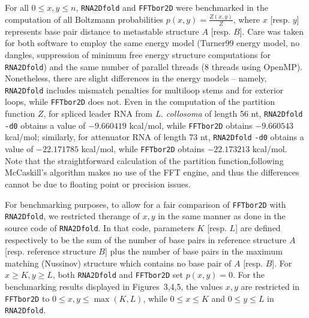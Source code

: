 For all $0 \leq x,y \leq n$, {\tt RNA2Dfold} and {\tt FFTbor2D} were
benchmarked in the computation of all Boltzmann probabilities
$p(x,y)= \frac{Z(x,y)}{Z}$, where $x$ [resp. $y$] represents base pair
distance to metastable structure $A$ [resp. $B$]. Care was taken for
both software to employ the same energy model (Turner99 energy model,
no dangles, suppression of minimum free energy structure computations
for {\tt RNA2Dfold}) and the same number of parallel threads (8 threads
using OpenMP). Nonetheless, there are slight differences in the energy
models -- namely, {\tt RNA2Dfold} includes
mismatch penalties for multiloop stems and for exterior loops, while
{\tt FFTbor2D} does not. Even in the computation of the partition function
$Z$, for spliced leader RNA from {\em L. collosoma} of length 56 nt,
{\tt RNA2Dfold} {\tt -d0} obtains a value of
$-9.660419$ kcal/mol, while {\tt FFTbor2D} obtains
$-9.660543$ kcal/mol; similarly, for attenuator RNA of length 73 nt,
{\tt RNA2Dfold} {\tt -d0} obtains a value of
$-22.171785$ kcal/mol, while {\tt FFTbor2D} obtains
$-22.173213$ kcal/mol.
Note that the straightforward calculation of the partition function,following McCaskill's algorithm \cite{mcCaskill}makes no use of the FFT engine, and thus the
differences cannot be due to floating point or precision issues.

For benchmarking purposes,
to allow for a fair comparison of {\tt FFTbor2D}
with {\tt RNA2Dfold}, we restricted therange of $x,y$ in the same manner as done in the source code of {\tt RNA2Dfold}.
In that code, parameters $K$ [resp. $L$] are defined respectively to be the
sum of the number of base pairs in reference structure $A$
[resp. reference structure $B$] plus the number of base pairs in
the maximum matching (Nussinov) structure which contains
no base pair of $A$ [resp. $B$].
For $x \geq K, y \geq L$, both {\tt RNA2Dfold} and {\tt FFTbor2D}
set $p(x,y)=0$.  For the benchmarking results displayed in
Figures~3,4,5, the values $x,y$ are restricted in
{\tt FFTbor2D} to $0 \leq x,y \leq \max(K,L)$, while $0 \leq x \leq K$
and $0 \leq y \leq L$ in {\tt RNA2Dfold}.

